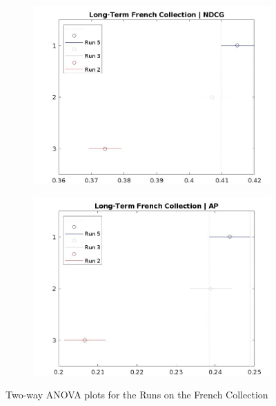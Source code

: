 \begin{figure}[!h]
    \centering
    \begin{subfigure}[b]{0.49\textwidth}
      \centering
      \includegraphics[width=\textwidth]{figure/StatisticalAnalysis/ANOVA 2/ndcg-lt-fr.jpeg}
      \label{fig:lt_anova_french_ndcg}
    \end{subfigure}
    \hfill
    \begin{subfigure}[b]{0.49\textwidth}
      \centering
      \includegraphics[width=\textwidth]{figure/StatisticalAnalysis/ANOVA 2/ap-lt-fr.jpeg}
      \label{fig:lt_anova_french_ap}
    \end{subfigure}
    \caption{Two-way \ac{ANOVA} plots for the Runs on the French Collection}
    \label{fig:lt_anova_french}
  \end{figure}

